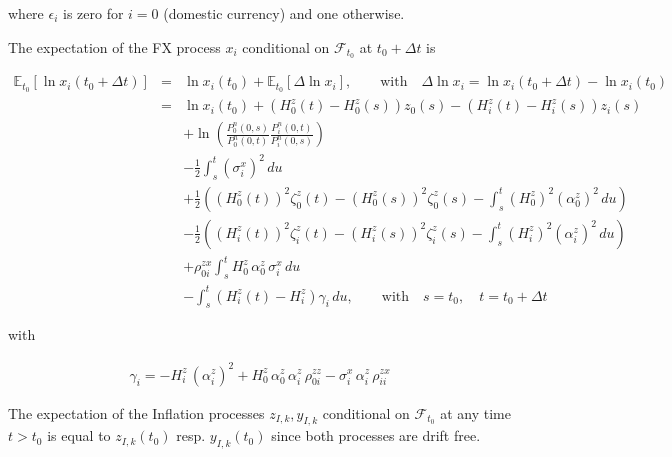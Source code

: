 where $\epsilon_i$ is zero for $i=0$ (domestic currency) and one otherwise.

\bigskip

The expectation of the FX process $x_i$ conditional on $\mathcal{F}_{t_0}$ at $t_0+\Delta t$ is

\begin{eqnarray*}
  \mathbb{E}_{t_0}[\ln x_i(t_0+\Delta t)] &=& \ln x_i(t_0) +  \mathbb{E}_{t_0}[\Delta \ln x_i],
  \qquad\mbox{with}\quad \Delta \ln x_i = \ln x_i(t_0+\Delta t) - \ln x_i(t_0) \\
  &=& \ln x_i(t_0) + \left(H^z_0(t)-H^z_0(s)\right) z_0(s) -\left(H^z_i(t)-H^z_i(s)\right)z_i(s)\\
  &&+ \ln \left( \frac{P^n_0(0,s)}{P^n_0(0,t)} \frac{P^n_i(0,t)}{P^n_i(0,s)}\right) \\
  && - \frac12 \int_s^t (\sigma^x_i)^2\,du \\
  &&+\frac12 \left((H^z_0(t))^2 \zeta^z_0(t) -  (H^z_0(s))^2 \zeta^z_0(s)- \int_s^t (H^z_0)^2
  (\alpha^z_0)^2\,du\right)\\
  &&-\frac12 \left((H^z_i(t))^2 \zeta^z_i(t) -  (H^z_i(s))^2 \zeta^z_i(s)-\int_s^t (H^z_i)^2 (\alpha^z_i)^2\,du
  \right)\\
  && + \rho^{zx}_{0i} \int_s^t H^z_0\, \alpha^z_0\, \sigma^x_i\,du \\
  &&  - \int_s^t \left(H^z_i(t)-H^z_i\right)\gamma_i \,du, \qquad\mbox{with}\quad s = t_0, \quad t = t_0+\Delta t
\end{eqnarray*}

with

\begin{eqnarray*}
  \gamma_i = -H^z_i\,(\alpha^z_i)^2  + H^z_0\,\alpha^z_0\,\alpha^z_i\,\rho^{zz}_{0i} - \sigma_i^x\,\alpha^z_i\,
  \rho^{zx}_{ii}
\end{eqnarray*}

The expectation of the Inflation processes $z_{I,k}, y_{I,k}$ conditional on $\mathcal{F}_{t_0}$ at any time $t>t_0$ is
equal to $z_{I,k}(t_0)$ resp. $y_{I,k}(t_0)$ since both processes are drift free.

\bigskip

